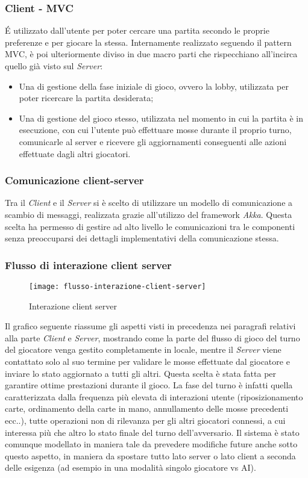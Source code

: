 \subsubsection{Client - MVC}
É utilizzato dall’utente per poter cercare una partita secondo le proprie preferenze e per giocare la stessa.
Internamente realizzato seguendo il pattern MVC, è poi ulteriormente diviso in due macro parti che rispecchiano all’incirca quello già visto sul \textit{Server}:
\begin{itemize}
    \item Una di gestione della fase iniziale di gioco, ovvero la lobby, utilizzata per poter ricercare la partita desiderata;
    \item Una di gestione del gioco stesso, utilizzata nel momento in cui la partita è in esecuzione, con cui l’utente può effettuare mosse durante il proprio turno, comunicarle al server e ricevere gli aggiornamenti conseguenti alle azioni effettuate dagli altri giocatori.
\end{itemize}
\subsubsection{Comunicazione client-server}
Tra il \textit{Client} e il \textit{Server} si è scelto di utilizzare un modello di comunicazione a scambio di messaggi, realizzata grazie all’utilizzo del framework \textit{Akka}.
Questa scelta ha permesso di gestire ad alto livello le comunicazioni tra le componenti senza preoccuparsi dei dettagli implementativi della comunicazione stessa.
\subsubsection[Flussi di interazione]{Flusso di interazione client server}
\begin{figure}
    \centering
    \texttt{[image: flusso-interazione-client-server]}
    \caption{Interazione client server}
\end{figure}
Il grafico seguente riassume gli aspetti visti in precedenza nei paragrafi relativi alla parte \textit{Client} e \textit{Server}, mostrando come la parte del flusso di gioco del turno del giocatore venga gestito completamente in locale, mentre il \textit{Server} viene contattato solo al suo termine per validare le mosse effettuate dal giocatore e inviare lo stato aggiornato a tutti gli altri.
Questa scelta è stata fatta per garantire ottime prestazioni durante il gioco.
La fase del turno è infatti quella caratterizzata dalla frequenza più elevata di interazioni utente (riposizionamento carte, ordinamento della carte in mano, annullamento delle mosse precedenti ecc..), tutte operazioni non di rilevanza per gli altri giocatori connessi, a cui interessa più che altro lo stato finale del turno dell’avversario.
Il sistema è stato comunque modellato in maniera tale da prevedere modifiche future anche sotto questo aspetto, in maniera da spostare tutto lato server o lato client a seconda delle esigenza (ad esempio in una modalità singolo giocatore vs AI).

\newpage